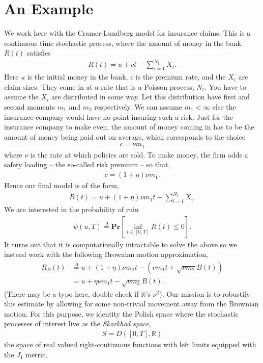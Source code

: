\documentclass[12pt]{article}
\newcommand{\R}{\mathbb{R}}
\renewcommand{\Pr}{\textbf{Pr}}
\newcommand{\define}{\overset{\Delta}{=}}
\theoremstyle{definition}
\theoremstyle{definition}
\theoremstyle{definition}
\begin{document}
\section*{An Example}
We work here with the Cramer-Lundberg model for insurance claims. This is a continuous time stochastic process, where the amount of money in the bank $R(t)$ satisfies
\begin{align*}
R(t)=u+ct-\sum_{i=1}^{N_t}X_i.
\end{align*}
Here $u$ is the initial money in the bank, $c$ is the premium rate, and the $X_i$ are claim sizes. They come in at a rate that is a Poisson process, $N_t$. You have to assume the $X_i$ are distributed in some way. Let this distribution have first and second moments $m_1$ and $m_2$ respectively. We can assume $m_1<\infty$ else the insurance company would have no point insuring such a risk. Just for the insurance company to make even, the amount of money coming in has to be the amount of money being paid out on average, which corresponds to the choice
\begin{align*}
c=\nu m_1
\end{align*}
where $\nu$ is the rate at which policies are sold. To make money, the firm adds a safety loading -- the so-called risk premium -- so that,
\begin{align*}
c=(1+\eta)\nu m_1.
\end{align*}
Hence our final model is of the form,
\begin{align*}
R(t)=u+(1+\eta)\nu m_1t-\sum_{i=1}^{N_t}X_i.
\end{align*}
We are interested in the probability of ruin
\begin{align*}
\psi(u,T)\define\Pr\left[\inf_{t\in[0,T]} R(t)\leq 0\right].
\end{align*}
It turns out that it is computationally intractable to solve the above so we instead work with the following Brownian motion approximation,
\begin{align*}
R_B(t)&\define u+(1+\eta)\nu m_1t - (\nu m_1t + \sqrt{\nu m_2}B(t))\\
&=u+\eta \nu m_1t-\sqrt{\nu m_2}B(t).
\end{align*}
(There may be a typo here, double check if it's $\nu^2$). Our mission is to robustify this estimate by allowing for some non-trivial movement away from the Brownian motion. For this purpose, we identity the Polish space where the stochastic processes of interest live as the \emph{Skorkhod space},
\begin{align*}
S=D([0,T],\R)
\end{align*}
the space of real valued right-continuous functions with left limits equipped with the $J_1$ metric. 
\end{document}

